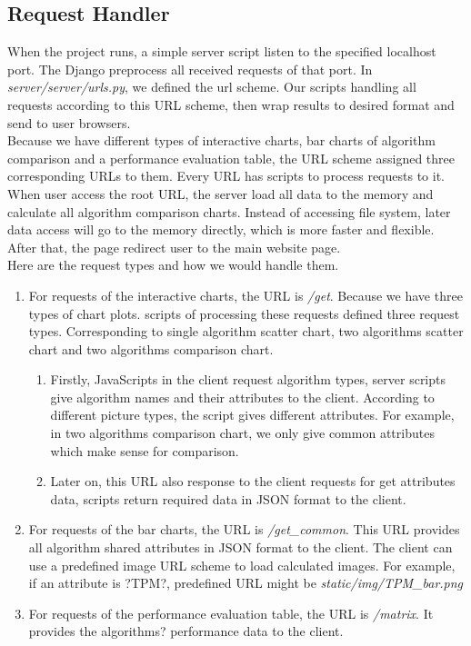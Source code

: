 \documentclass[11pt,letter]{article}
\begin{document}
\subsection {Request Handler}
When the project runs, a simple server script listen to the specified localhost port. The Django preprocess all received requests of that port. In \emph{server/server/urls.py}, we defined the url scheme. Our scripts handling all requests according to this URL scheme, then wrap results to desired format and send to user browsers.  \\
Because we have different types of interactive charts, bar charts of algorithm comparison and a performance evaluation table, the URL scheme assigned three corresponding URLs to them. Every URL has scripts to process requests to it. \\
When user access the root URL, the server load all data to the memory and calculate all algorithm comparison charts. Instead of accessing file system, later data access will go to the memory directly, which is more faster and flexible. After that, the page redirect user to the main website page. \\
Here are the request types and how we would handle them.
\begin{enumerate}
\item For requests of the interactive charts, the URL is \emph{/get}. Because we have three types of chart plots. scripts of processing these requests defined three request types. Corresponding to single algorithm scatter chart, two algorithms scatter chart and two algorithms comparison chart.
\begin{enumerate}
\item Firstly, JavaScripts in the client request algorithm types, server scripts give algorithm names and their attributes to the client. According to different picture types, the script gives different attributes. For example, in two algorithms comparison chart, we only give common attributes which make sense for comparison.
\item Later on, this URL also response to the client requests for get attributes data, scripts return required data in JSON format to the client.
\end{enumerate}
\item For requests of the bar charts, the URL is \emph{/get\_common}. This URL provides all algorithm shared attributes in JSON format to the client. The client can use a predefined image URL scheme to load calculated images. For example, if an attribute is ?TPM?, predefined URL might be \emph{static/img/TPM\_bar.png}
\item For requests of the performance evaluation table, the URL is \emph{/matrix}. It provides the algorithms? performance data to the client.
\end{enumerate}
\end{document}
